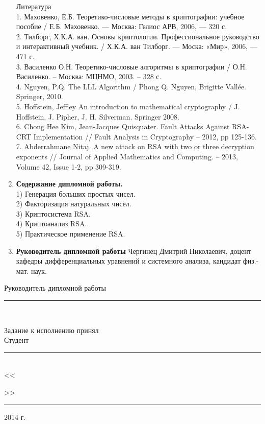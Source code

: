 \begin{titlepage}
\begin{enumerate}
			Литература \\
				1. Маховенко, Е.Б. Теоретико-числовые методы в криптографии: учебное пособие /  Е.Б. Маховенко. — Москва: Гелиос АРВ, 2006, — 320 с. \\
				2. Тилборг, Х.К.А. ван. Основы криптологии. Профессиональное руководство и интерактивный учебник. /  Х.К.А. ван Тилборг. — Моска: «Мир», 2006, — 471 с. \\
				3. Василенко О.Н. Теоретико-числовые алгоритмы в криптографии / О.Н. Василенко. – Москва: МЦНМО, 2003. – 328 с. \\
				4. Nguyen, P.Q. The LLL Algorithm / Phong Q. Nguyen, Brigitte Vallée. Springer, 2010. \\
				5. Hoffstein, Jeffley An introduction to mathematical cryptography / J. Hoffstein, J. Pipher, J. H. Silverman. Springer 2008.  \\
				6. Chong Hee Kim, Jean-Jacques Quisquater. Fault Attacks Against RSA-CRT Implementation // Fault Analysis in Cryptography – 2012, pp 125-136. \\
				7. Abderrahmane Nitaj. A new attack on RSA with two or three decryption exponents // Journal of Applied Mathematics and Computing. – 2013, Volume 42, Issue 1-2, pp 309-319.			
		\item \textbf{Содержание дипломной работы.} \\
			1) Генерация больших простых чисел. \\
			2) Факторизация натуральных чисел. \\
			3) Криптосистема RSA. \\
			4) Криптоанализ RSA. \\
			5) Практическое применение RSA. 
		\item \textbf{Руководитель дипломной работы} Чергинец Дмитрий Николаевич, доцент кафедры дифференциальных уравнений и системного анализа, кандидат физ.-мат. наук.
	\end{enumerate}

	\vspace{0.5cm}

	\begin{flushleft}
		Руководитель дипломной работы \rule{7cm}{0.1pt} \\

		\vspace{0.25cm}

		Задание к исполнению принял \\
		Студент \rule{7cm}{0.1pt} \\
		<<\rule{0,75cm}{0.1pt}>> \rule{4cm}{0.1pt} 2014 г.
	\end{flushleft}

\end{titlepage}